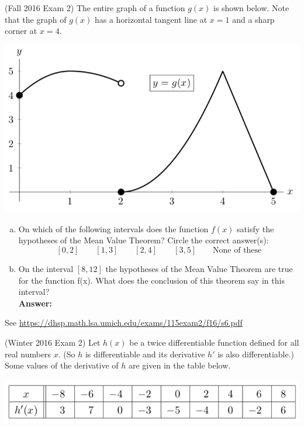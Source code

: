 \documentclass[11pt]{exam}
\begin{document}
\begin{questions}
                \question (Fall 2016 Exam 2)
The entire graph of a function \(g(x)\) is shown below. Note that the graph of \(g(x)\)
has a horizontal tangent line at \(x = 1\) and a sharp corner at \(x = 4\).
\begin{center}
  \includegraphics[scale=0.4]{Figures/Fall2016Exam2Problem6}
\end{center}
\begin{enumerate}[(a)]
\item On which of the following intervals does the function \(f(x)\) satisfy the hypotheses of
  the Mean Value Theorem? Circle the correct answer(s): \[
[0,2] \qquad [1,3] \qquad [2,4] \qquad [3,5] \qquad \textrm{None of these}
  \]
\item On the interval \([8, 12]\) the hypotheses of the Mean Value Theorem are true for the
function f(x). What does the conclusion of this theorem say in this interval?\\
{\bf Answer:}
\vspace{0.5in}
\end{enumerate}
\begin{solution}
  See \href{https://dhsp.math.lsa.umich.edu/exams/115exam2/f16/s6.pdf}{https://dhsp.math.lsa.umich.edu/exams/115exam2/f16/s6.pdf}
\end{solution}
\question (Winter 2016 Exam 2) Let $h(x)$ be a twice differentiable function defined for all real numbers $x$. (So $h$ is differentiable and its derivative $h'$ is also differentiable.)
Some values of the derivative of $h$ are given in the table below.
\begin{center}
  \includegraphics[scale=0.5]{Figures/Winter2016Exam2Problem4}
\end{center}


\end{questions}
\end{document}
